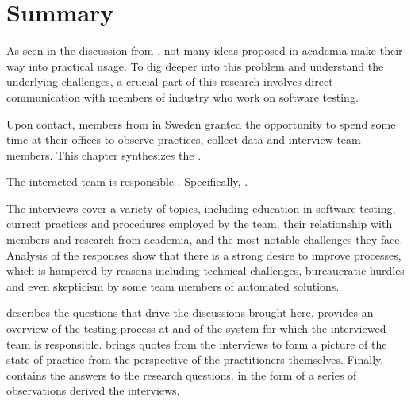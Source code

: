 \section{Summary}\label{sec:ind_summary}

As seen in the discussion from , not many ideas proposed in academia make their way into practical usage.
To dig deeper into this problem and understand the underlying challenges, a crucial part of this research involves direct communication with members of industry who work on software testing.

Upon contact, members from  in Sweden granted the opportunity to spend some time at their offices to observe practices, collect data and interview team members.
This chapter synthesizes the .

The interacted team is responsible .
Specifically, .

The interviews cover a variety of topics, including education in software testing, current practices and procedures employed by the team, their relationship with members and research from academia, and the most notable challenges they face.
Analysis of the responses show that there is a strong desire to improve processes, which is hampered by reasons including technical challenges, bureaucratic hurdles and even skepticism by some team members of automated solutions.

 describes the questions that drive the discussions brought here.
 provides an overview of the testing process at  and of the system for which the interviewed team is responsible.
 brings quotes from the interviews to form a picture of the state of practice from the perspective of the practitioners themselves.
Finally,  contains the answers to the research questions, in the form of a series of observations derived the interviews.



